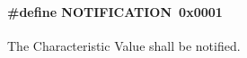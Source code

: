 \paragraph[{\texorpdfstring{N\+O\+T\+I\+F\+I\+C\+A\+T\+I\+ON}{NOTIFICATION}}]{\setlength{\rightskip}{0pt plus 5cm}\#define N\+O\+T\+I\+F\+I\+C\+A\+T\+I\+ON~0x0001}\hypertarget{group___b_l_e___g_a_t_t___c_c_c_d___b_i_t_s_ga6985e58a0ff3195dca91e5aaca02e372}{}\label{group___b_l_e___g_a_t_t___c_c_c_d___b_i_t_s_ga6985e58a0ff3195dca91e5aaca02e372}
The Characteristic Value shall be notified. 